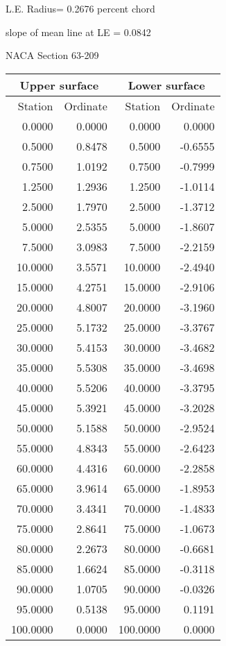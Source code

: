 \documentclass[11pt]{book}
\begin{document}
L.E. Radius=  0.2676 percent chord


 slope of mean line at LE =  0.0842
 \newpage
  \label{s63-209}
 \begin{Large}
 NACA Section 63-209
 \end{Large}
  
 \vspace{8mm}
 \begin{tabular}{|r|r|r|r|} \hline 
 \multicolumn{2}{|c|}{Upper surface} & \multicolumn{2}{|c|}{Lower surface} \\
 \hline
 Station & Ordinate & Station & Ordinate \\
 \hline
0.0000 & 0.0000 & 0.0000 & 0.0000 \\
0.5000 & 0.8478 & 0.5000 & -0.6555 \\
0.7500 & 1.0192 & 0.7500 & -0.7999 \\
1.2500 & 1.2936 & 1.2500 & -1.0114 \\
2.5000 & 1.7970 & 2.5000 & -1.3712 \\
5.0000 & 2.5355 & 5.0000 & -1.8607 \\
7.5000 & 3.0983 & 7.5000 & -2.2159 \\
10.0000 & 3.5571 & 10.0000 & -2.4940 \\
15.0000 & 4.2751 & 15.0000 & -2.9106 \\
20.0000 & 4.8007 & 20.0000 & -3.1960 \\
25.0000 & 5.1732 & 25.0000 & -3.3767 \\
30.0000 & 5.4153 & 30.0000 & -3.4682 \\
35.0000 & 5.5308 & 35.0000 & -3.4698 \\
40.0000 & 5.5206 & 40.0000 & -3.3795 \\
45.0000 & 5.3921 & 45.0000 & -3.2028 \\
50.0000 & 5.1588 & 50.0000 & -2.9524 \\
55.0000 & 4.8343 & 55.0000 & -2.6423 \\
60.0000 & 4.4316 & 60.0000 & -2.2858 \\
65.0000 & 3.9614 & 65.0000 & -1.8953 \\
70.0000 & 3.4341 & 70.0000 & -1.4833 \\
75.0000 & 2.8641 & 75.0000 & -1.0673 \\
80.0000 & 2.2673 & 80.0000 & -0.6681 \\
85.0000 & 1.6624 & 85.0000 & -0.3118 \\
90.0000 & 1.0705 & 90.0000 & -0.0326 \\
95.0000 & 0.5138 & 95.0000 & 0.1191 \\
100.0000 & 0.0000 & 100.0000 & 0.0000 \\
 \hline 
 \end{tabular}
\end{document}
